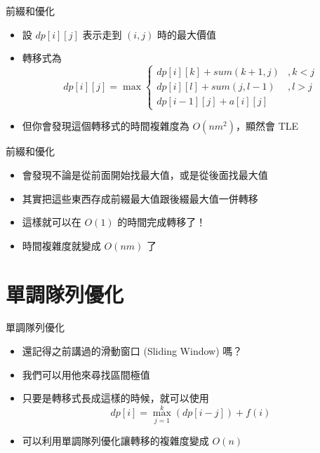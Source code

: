 \documentclass[aspectratio=169]{beamer}
\begin{document}
    \begin{frame}{前綴和優化}
        \begin{itemize}
            \item 設 $dp[i][j]$ 表示走到 $(i,j)$ 時的最大價值
            \item 轉移式為
            $$dp[i][j] = \max \begin{cases}dp[i][k] + sum(k+1,j) &, k < j \\ dp[i][l] + sum(j,l-1) &, l > j\\ dp[i-1][j] + a[i][j]\end{cases}$$
            \item<2-> 但你會發現這個轉移式的時間複雜度為 $O(nm^2)$，顯然會 TLE
        \end{itemize}
    \end{frame}
    
    \begin{frame}{前綴和優化}
        \begin{itemize}
            \item 會發現不論是從前面開始找最大值，或是從後面找最大值
            \item 其實把這些東西存成前綴最大值跟後綴最大值一併轉移
            \item 這樣就可以在 $O(1)$ 的時間完成轉移了！
            \item 時間複雜度就變成 $O(nm)$ 了
        \end{itemize}
    \end{frame}

    \section{單調隊列優化}

    \begin{frame}{單調隊列優化}
        \begin{itemize}
            \item 還記得之前講過的滑動窗口 (Sliding Window) 嗎？
            \item<2-> 我們可以用他來尋找區間極值
            \item<3-> 只要是轉移式長成這樣的時候，就可以使用
            $$dp[i] = \max_{j=1}^{k}(dp[i-j]) + f(i)$$
            \item<3-> 可以利用單調隊列優化讓轉移的複雜度變成 $O(n)$
        \end{itemize}
    \end{frame}
    
\end{document}
